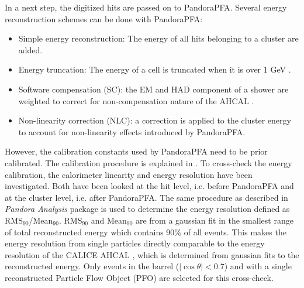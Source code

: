 In a next step, the digitized hits are passed on to PandoraPFA. Several energy reconstruction schemes can be done with PandoraPFA:
\begin{itemize}
  \item Simple energy reconstruction: The energy of all hits belonging to a cluster are added.
  \item Energy truncation: The energy of a cell is truncated when it is over 1 GeV \cite{Tran:2017tgr}.
  \item Software compensation (SC): the EM and HAD component of a shower are weighted to correct for non-compensation nature of the AHCAL \cite{Tran:2017tgr}.
  \item Non-linearity correction (NLC): a correction is applied to the cluster energy to account for non-linearity effects introduced by PandoraPFA.
\end{itemize}
However, the calibration constants used by PandoraPFA need to be prior calibrated. The calibration procedure is explained in \cite{PandoraCalib}. To cross-check the energy calibration, the calorimeter linearity and energy resolution have been investigated. Both have been looked at the hit level, i.e. before PandoraPFA and at the cluster level, i.e. after PandoraPFA. The same procedure as described in \textit{Pandora Analysis} package is used to determine the energy resolution defined as RMS$_{90}$/Mean$_{90}$. RMS$_{90}$ and Mean$_{90}$ are from a gaussian fit in the smallest range of total reconstructed energy which contains 90\% of all events. This makes the energy resolution from single particles directly comparable to the energy resolution of the CALICE AHCAL \cite{Tran:2017tgr, SoftCompNew2012}, which is determined from gaussian fits to the reconstructed energy. Only events in the barrel ($|\cos\theta| < 0.7$) and with a single reconstructed Particle Flow Object (PFO) are selected for this cross-check.

